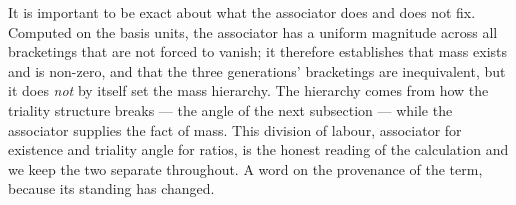 It is important to be exact about what the associator does and does not fix. Computed on the basis
units, the associator has a uniform magnitude across all bracketings that are not forced to vanish;
it therefore establishes that mass exists and is non-zero, and that the three generations'
bracketings are inequivalent, but it does \emph{not} by itself set the mass hierarchy. The hierarchy
comes from how the triality structure breaks --- the angle of the next subsection --- while the
associator supplies the fact of mass. This division of labour, associator for existence and triality
angle for ratios, is the honest reading of the calculation and we keep the two separate throughout.
A word on the provenance of the term, because its standing has changed.
